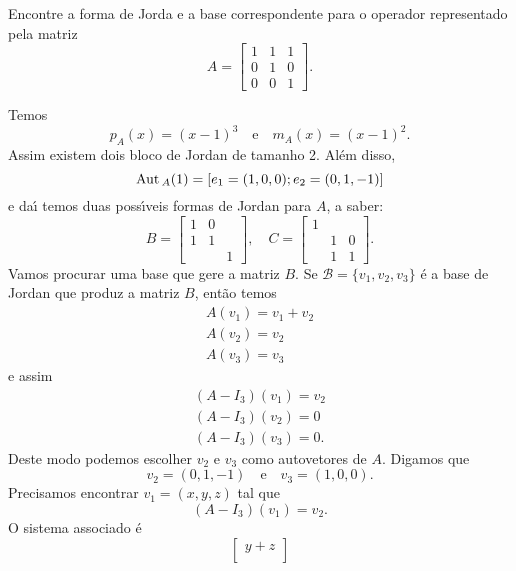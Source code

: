 \begin{enumerate}[label={\arabic*})]
    Encontre a forma de Jorda e a base correspondente para o operador representado pela matriz
    \[
        A = \begin{bmatrix}
            1 & 1 & 1\\
            0 & 1 & 0\\
            0 & 0 & 1
        \end{bmatrix}.
    \]
    \begin{solucao}
        Temos
        \[
            p_A(x) = (x - 1)^3 \quad \mbox{e}\quad m_A(x) = (x - 1)^2.
        \]
        Assim existem dois bloco de Jordan de tamanho 2. Al\'em disso,
        \[
            {\rm Aut\,}_A(1) = [e_1 = (1,0,0); e_2 = (0,1,-1)]
        \]
        e da{\'\i} temos duas poss{\'\i}veis formas de Jordan para $A$, a saber:
        \[
            B = \begin{bmatrix}
                1 & 0 &\\
                1 & 1 &\\
                & & 1
            \end{bmatrix},\quad
            C = \begin{bmatrix}
                 1 &  &\\
                 & 1 & 0\\
                 & 1 & 1
            \end{bmatrix}.
        \]
        Vamos procurar uma base que gere a matriz $B$. Se $\mathcal{B} = \{v_1, v_2, v_3\}$ \'e a base de Jordan que produz a matriz $B$, ent\~ao temos
        \begin{align*}
            A(v_1) = v_1 + v_2\\
            A(v_2) = v_2\\
            A(v_3) = v_3
        \end{align*}
        e assim
        \begin{align*}
            (A - I_3)(v_1) = v_2\\
            (A - I_3)(v_2) = 0\\
            (A - I_3)(v_3) = 0.
        \end{align*}
        Deste modo podemos escolher $v_2$ e $v_3$ como autovetores de $A$. Digamos que
        \[
            v_2 = (0,1,-1) \quad \mbox{e} \quad v_3 = (1,0,0).
        \]
        Precisamos encontrar $v_1 = (x,y,z)$ tal que
        \[
            (A - I_3)(v_1) = v_2.
        \]
        O sistema associado \'e
        \[
            \begin{bmatrix}
                y + z\\

\end{bmatrix}\]
\end{solucao}
\end{enumerate}
